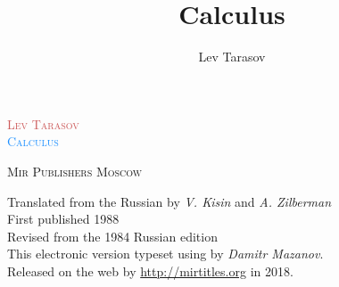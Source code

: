 \documentclass[b5paper,12pt]{book}
\title{Calculus}
\author{Lev Tarasov}
\date{}
\begin{document}


\thispagestyle{empty}

\frontmatter
\thispagestyle{empty}
\vspace*{5cm}
\begin{center}
\begin{Huge}
\textcolor{IndianRed}{\textsc{\fontsize{40}{45}\selectfont Lev Tarasov}}\\[1cm] 
\textcolor{DodgerBlue}{\textsc{\fontsize{60}{65}\selectfont Calculus }}\\[1cm]
\end{Huge}
\vspace{7cm}
\textsc{\fontsize{20}{25}\selectfont Mir Publishers Moscow}
\end{center}
\newpage
\thispagestyle{empty}

\noindent
\begin{smaller}
Translated from the Russian by \emph{V. Kisin} and \emph{A. Zilberman}\\
First published 1988 \\
\noindent
Revised from the 1984 Russian edition \\[10pt]
\noindent
This electronic version typeset using \XeLaTeX{} by \emph{Damitr Mazanov}.  \\ 
Released on the web by \textcolor{DodgerBlue}{\url{http://mirtitles.org}} in 2018.
\setcounter{tocdepth}{3}
\end{smaller}
\cleardoublepage
\tableofcontents




\cleardoublepage
\mainmatter

















\end{document}
